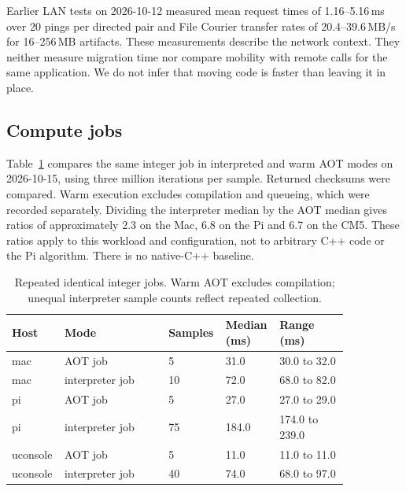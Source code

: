 Earlier LAN tests on 2026-10-12 measured mean request times of
1.16--5.16\,ms over 20 pings per directed pair and File Courier transfer
rates of 20.4--39.6\,MB/s for 16--256\,MB artifacts. These measurements
describe the network context. They neither measure migration time nor
compare mobility with remote calls for the same application. We do not
infer that moving code is faster than leaving it in place.

\subsection{Compute jobs}\label{sec:evaluation-compute}

Table~\ref{tab:eval-jobs} compares the same integer job in interpreted
and warm AOT modes on 2026-10-15, using three million iterations per
sample. Returned checksums were compared. Warm execution excludes
compilation and queueing, which were recorded separately. Dividing the
interpreter median by the AOT median gives ratios of approximately 2.3
on the Mac, 6.8 on the Pi and 6.7 on the CM5. These ratios apply to this
workload and configuration, not to arbitrary C++ code or the Pi algorithm.
There is no native-C++ baseline.

\begin{table}[htbp]
\centering\small
\caption{Repeated identical integer jobs. Warm AOT excludes compilation; unequal interpreter sample counts reflect repeated collection.}
\label{tab:eval-jobs}
\setlength{\tabcolsep}{3pt}
\begin{tabular}{p{0.12\linewidth}p{0.3\linewidth}p{0.1\linewidth}p{0.13\linewidth}p{0.2\linewidth}}
\toprule
Host & Mode & Samples & Median (ms) & Range (ms) \\
\midrule
mac & AOT job & 5 & 31.0 & 30.0 to 32.0 \\
mac & interpreter job & 10 & 72.0 & 68.0 to 82.0 \\
pi & AOT job & 5 & 27.0 & 27.0 to 29.0 \\
pi & interpreter job & 75 & 184.0 & 174.0 to 239.0 \\
uconsole & AOT job & 5 & 11.0 & 11.0 to 11.0 \\
uconsole & interpreter job & 40 & 74.0 & 68.0 to 97.0 \\
\bottomrule
\end{tabular}
\end{table}

